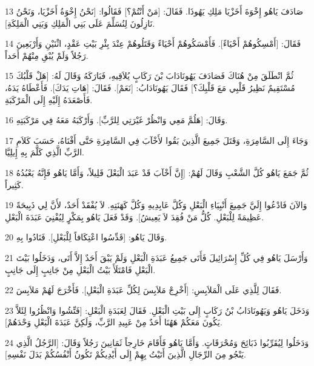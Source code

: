 \par 13 صَادَفَ يَاهُو إِخْوَةَ أَخَزْيَا مَلِكِ يَهُوذَا. فَقَالَ: [مَنْ أَنْتُمْ؟] فَقَالُوا: [نَحْنُ إِخْوَةُ أَخَزْيَا، وَنَحْنُ نَازِلُونَ لِنُسَلِّمَ عَلَى بَنِي الْمَلِكِ وَبَنِي الْمَلِكَةِ].
\par 14 فَقَالَ: [أَمْسِكُوهُمْ أَحْيَاءً]. فَأَمْسَكُوهُمْ أَحْيَاءً وَقَتَلُوهُمْ عِنْدَ بِئْرِ بَيْتِ عَقْدٍ، اثْنَيْنِ وَأَرْبَعِينَ رَجُلاً وَلَمْ يُبْقِ مِنْهُمْ أَحَداً.
\par 15 ثُمَّ انْطَلَقَ مِنْ هُنَاكَ فَصَادَفَ يَهُونَادَابَ بْنَ رَكَابٍ يُلاَقِيهِ، فَبَارَكَهُ وَقَالَ لَهُ: [هَلْ قَلْبُكَ مُسْتَقِيمٌ نَظِيرُ قَلْبِي مَعَ قَلْبِكَ؟] فَقَالَ يَهُونَادَابُ: [نَعَمْ]. فَقَالَ: [هَاتِ يَدَكَ]. فَأَعْطَاهُ يَدَهُ، فَأَصْعَدَهُ إِلَيْهِ إِلَى الْمَرْكَبَةِ.
\par 16 وَقَالَ: [هَلُمَّ مَعِي وَانْظُرْ غَيْرَتِي لِلرَّبِّ]. وَأَرْكَبَهُ مَعَهُ فِي مَرْكَبَتِهِ.
\par 17 وَجَاءَ إِلَى السَّامِرَةِ، وَقَتَلَ جَمِيعَ الَّذِينَ بَقُوا لأَخْآبَ فِي السَّامِرَةِ حَتَّى أَفْنَاهُ، حَسَبَ كَلاَمِ الرَّبِّ الَّذِي كَلَّمَ بِهِ إِيلِيَّا.
\par 18 ثُمَّ جَمَعَ يَاهُو كُلَّ الشَّعْبِ وَقَالَ لَهُمْ: [إِنَّ أَخْآبَ قَدْ عَبَدَ الْبَعْلَ قَلِيلاً، وَأَمَّا يَاهُو فَإِنَّهُ يَعْبُدُهُ كَثِيراً.
\par 19 وَالآنَ فَادْعُوا إِلَيَّ جَمِيعَ أَنْبِيَاءِ الْبَعْلِ وَكُلَّ عَابِدِيهِ وَكُلَّ كَهَنَتِهِ. لاَ يُفْقَدْ أَحَدٌ، لأَنَّ لِي ذَبِيحَةً عَظِيمَةً لِلْبَعْلِ. كُلُّ مَنْ فُقِدَ لاَ يَعِيشُ]. وَقَدْ فَعَلَ يَاهُو بِمَكْرٍ لِيُفْنِيَ عَبَدَةَ الْبَعْلِ.
\par 20 وَقَالَ يَاهُو: [قَدِّسُوا اعْتِكَافاً لِلْبَعْلِ]. فَنَادُوا بِهِ.
\par 21 وَأَرْسَلَ يَاهُو فِي كُلِّ إِسْرَائِيلَ فَأَتَى جَمِيعُ عَبَدَةِ الْبَعْلِ وَلَمْ يَبْقَ أَحَدٌ إِلاَّ أَتَى، وَدَخَلُوا بَيْتَ الْبَعْلِ فَامْتَلَأَ بَيْتُ الْبَعْلِ مِنْ جَانِبٍ إِلَى جَانِبٍ.
\par 22 فَقَالَ لِلَّذِي عَلَى الْمَلاَبِسِ: [أَخْرِجْ مَلاَبِسَ لِكُلِّ عَبَدَةِ الْبَعْلِ]. فَأَخْرَجَ لَهُمْ مَلاَبِسَ.
\par 23 وَدَخَلَ يَاهُو وَيَهُونَادَابُ بْنُ رَكَابٍ إِلَى بَيْتِ الْبَعْلِ. فَقَالَ لِعَبَدَةِ الْبَعْلِ: [فَتِّشُوا وَانْظُرُوا لِئَلاَّ يَكُونَ مَعَكُمْ هَهُنَا أَحَدٌ مِنْ عَبِيدِ الرَّبِّ، وَلَكِنَّ عَبَدَةَ الْبَعْلِ وَحْدَهُمْ].
\par 24 وَدَخَلُوا لِيُقَرِّبُوا ذَبَائِحَ وَمُحْرَقَاتٍ. وَأَمَّا يَاهُو فَأَقَامَ خَارِجاً ثَمَانِينَ رَجُلاً وَقَالَ: [الرَّجُلُ الَّذِي يَنْجُو مِنَ الرِّجَالِ الَّذِينَ أَتَيْتُ بِهِمْ إِلَى أَيْدِيكُمْ تَكُونُ أَنْفُسُكُمْ بَدَلَ نَفْسِهِ].
